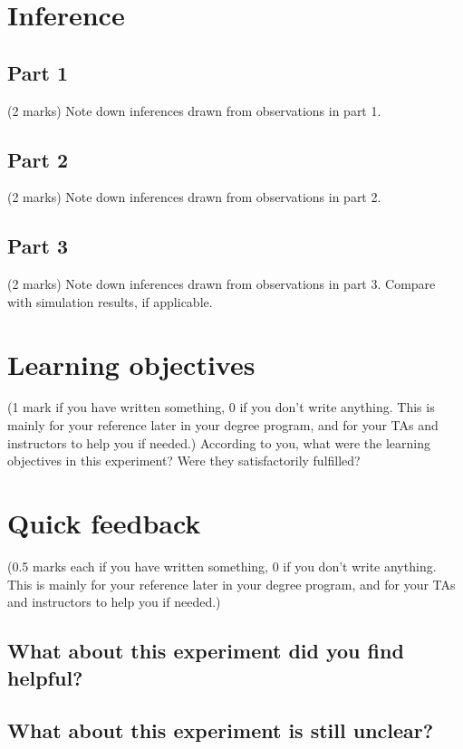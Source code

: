 \documentclass[12pt]{article}
\begin{document}
\section{Inference}

\subsection{Part 1}

(2 marks) Note down inferences drawn from observations in part 1. 

\subsection{Part 2}

(2 marks) Note down inferences drawn from observations in part 2.

\subsection{Part 3}

(2 marks) Note down inferences drawn from observations in part 3. Compare with simulation results, if applicable.

\section{Learning objectives}

(1 mark if you have written something, 0 if you don't write anything. This is mainly for your reference later in your degree program, and for your TAs and instructors to help you if needed.) According to you, what were the learning objectives in this experiment? Were they satisfactorily fulfilled?

\section{Quick feedback}

(0.5 marks each if you have written something, 0 if you don't write anything. This is mainly for your reference later in your degree program, and for your TAs and instructors to help you if needed.)

\subsection{What about this experiment did you find helpful?}

\subsection{What about this experiment is still unclear?}
\end{document}
